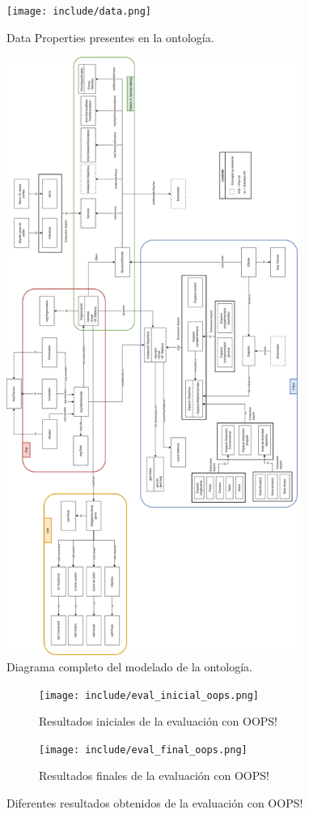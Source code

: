 \documentclass[a4paper,12pt]{article}
\begin{document}
	\begin{figure}[H]
		\centering
		\texttt{[image: include/data.png]}
		\caption{Data Properties presentes en la ontología.}
	\end{figure}
	
		\begin{figure}[H]
		\centering
		\includegraphics[width=0.85\textwidth]{include/diagrama_modelo_completo.png}
		\caption{Diagrama completo del modelado de la ontología.}
	\end{figure}
	
	\begin{figure}[H]
		\begin{subfigure}{.5\textwidth}
			\centering
			\texttt{[image: include/eval\_inicial\_oops.png]}
			\caption{Resultados iniciales de la evaluación con OOPS! }
		\end{subfigure}
		\begin{subfigure}{.5\textwidth}
			\centering
			\texttt{[image: include/eval\_final\_oops.png]}
			\caption{Resultados finales de la evaluación con OOPS!}
		\end{subfigure}
		\caption{Diferentes resultados obtenidos de la evaluación con OOPS!}
	\end{figure}
	
\end{document}
